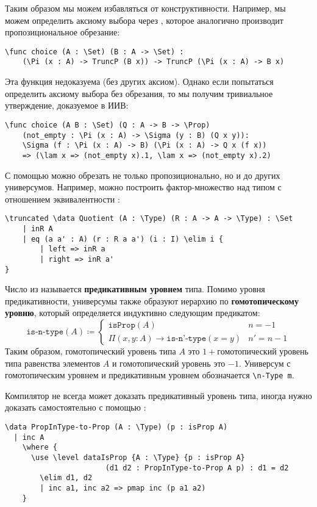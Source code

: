 Таким образом мы можем избавляться от конструктивности. Например, мы можем определить аксиому выбора через , которое аналогично \ard{\truncated} производит пропозициональное обрезание:

\begin{verbatim}
\func choice (A : \Set) (B : A -> \Set) :
    (\Pi (x : A) -> TruncP (B x)) -> TruncP (\Pi (x : A) -> B x)
\end{verbatim}

Эта функция недоказуема (без других аксиом). Однако если попытаться определить аксиому выбора без обрезания, то мы получим тривиальное утверждение, доказуемое в ИИВ:
\begin{verbatim}
\func choice (A B : \Set) (Q : A -> B -> \Prop)
    (not_empty : \Pi (x : A) -> \Sigma (y : B) (Q x y)):
    \Sigma (f : \Pi (x : A) -> B) (\Pi (x : A) -> Q x (f x))
    => (\lam x => (not_empty x).1, \lam x => (not_empty x).2)
\end{verbatim}

С помощью \ard{\truncated} можно обрезать не только пропозиционально, но и до других универсумов. Например, можно построить фактор-множество над типом  с отношением эквивалентности :
\begin{verbatim}
\truncated \data Quotient (A : \Type) (R : A -> A -> \Type) : \Set
    | inR A
    | eq (a a' : A) (r : R a a') (i : I) \elim i {
        | left => inR a
        | right => inR a'
}
\end{verbatim}

Число  из  называется \textbf{предикативным уровнем} типа. Помимо уровня предикативности, универсумы также образуют иерархию по \textbf{гомотопическому уровню}, который определяется индуктивно следующим предикатом:
\[
    \texttt{is-n-type}(A) \coloneqq \begin{cases}
        \texttt{isProp}(A) & n = - 1 \\
        \Pi (x, y : A) \to \texttt{is-n'-type}(x = y) & n' = n - 1
    \end{cases}
\]
Таким образом, гомотопический уровень типа $A$ это $1 +{}$гомотопический уровень типа равенства элементов $A$ и гомотопический уровень \ard{\Prop} это $-1$. Универсум с гомотопическим уровнем  и предикативным уровнем  обозначается \texttt{\textbackslash{}n-Type m}.

Компилятор не всегда может доказать предикативный уровень типа, иногда нужно доказать самостоятельно с помощью \ard{\use \level}:
\begin{verbatim}
\data PropInType-to-Prop (A : \Type) (p : isProp A)
  | inc A
    \where {
      \use \level dataIsProp {A : \Type} {p : isProp A} 
                       (d1 d2 : PropInType-to-Prop A p) : d1 = d2
        \elim d1, d2
        | inc a1, inc a2 => pmap inc (p a1 a2)
    }
\end{verbatim} 

